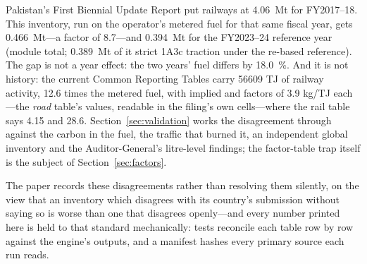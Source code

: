 Pakistan's First Biennial Update Report put railways at \SI{4.06}{\mega\tonne} \COe{} for
FY2017--18. This inventory, run on the operator's metered fuel for that same fiscal year,
gets \SI{0.466}{\mega\tonne}---a factor of \num{8.7}---and \SI{0.394}{\mega\tonne} for the
FY2023--24 reference year (module total; \SI{0.389}{\mega\tonne} of it strict 1A3c
traction under the re-based reference). The gap is not a year effect: the two years' fuel differs by
\SI{18.0}{\percent}. And it is not history: the current Common Reporting Tables carry
\num{56609} TJ of railway activity, \num{12.6} times the metered fuel, with implied
\CHfour{} and \NtwoO{} factors of \num{3.9} kg/TJ each---the \emph{road} table's values,
readable in the filing's own cells---where the rail table says \num{4.15} and \num{28.6}.
Section~\ref{sec:validation} works the disagreement through against the carbon in the
fuel, the traffic that burned it, an independent global inventory and the
Auditor-General's litre-level findings; the factor-table trap itself is the subject of
Section~\ref{sec:factors}.

The paper records these disagreements rather than resolving them silently, on the view
that an inventory which disagrees with its country's submission without saying so is worse
than one that disagrees openly---and every number printed here is held to that standard
mechanically: tests reconcile each table row by row against the engine's outputs, and a
manifest hashes every primary source each run reads.
